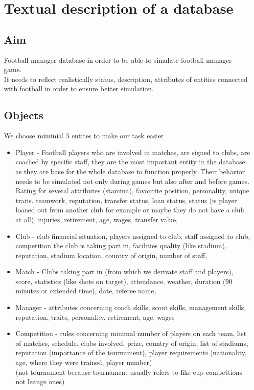 \documentclass{report}
\begin{document}
\chapter{Textual description of a database}
\section{Aim}

Football manager database in order to be able to simulate football manager game. \\ 
It needs to reflect realistically status, description, attributes of entities connected with football in order to ensure better simulation. \\ 


\section{Objects}
We choose miminial 5 entites to make our task easier \\ 
\begin{itemize}
    \item Player - Football players who are involved in matches, are signed to clubs, are coached by specific staff, they are the most important entity in the database as they are base for the whole database to function properly. Their behavior needs to be simulated not only during games but also after and before games. Rating for several attributes (stamina), favourite position, personality, unique traits. teamwork, reputation, transfer status, loan status, status (is player loaned out from another club for example or maybe they do not have a club at all), injuries, retirement, age, wages, transfer value, 
    \item Club - club financial situation, players assigned to club, staff assigned to club, competition the club is taking part in, facilities quality (like stadium), reputation, stadium location, country of origin, number of staff,
    \item Match - Clubs taking part in (from which we derivate staff and players), score, statistics (like shots on target), attendance, weather, duration (90 minutes or extended time), date, referee name,
    \item Manager - attributes concerning coach skills, scout skills, management skills, reputation, traits, personality, retirement, age, wages
    \item Competition - rules concerning minimal number of players on each team, list of matches, schedule, clubs involved, prize, country of origin, list of stadiums, reputation (importance of the tournament), player requirements (nationality, age, where they were trained, player number)\\
    (not tournament because tournament usually refers to like cup compettions not leauge ones)
\end{itemize} 
\end{document}
